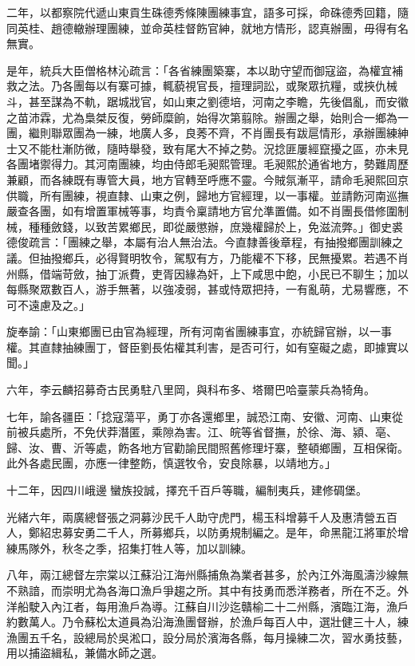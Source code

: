 \begin{pinyinscope}
二年，以都察院代遞山東貢生硃德秀條陳團練事宜，語多可採，命硃德秀回籍，隨同英桂、趙德轍辦理團練，並命英桂督飭官紳，就地方情形，認真辦團，毋得有名無實。

是年，統兵大臣僧格林沁疏言：「各省練團築寨，本以助守望而御寇盜，為權宜補救之法。乃各團每以有寨可據，輒藐視官長，擅理詞訟，或聚眾抗糧，或挾仇械斗，甚至謀為不軌，踞城戕官，如山東之劉德培，河南之李瞻，先後倡亂，而安徽之苗沛霖，尤為梟桀反復，勞師糜餉，始得次第翦除。辦團之舉，始則合一鄉為一團，繼則聯眾團為一練，地廣人多，良莠不齊，不肖團長有跋扈情形，承辦團練紳士又不能杜漸防微，隨時舉發，致有尾大不掉之勢。況捻匪屢經竄擾之區，亦未見各團堵禦得力。其河南團練，均由侍郎毛昶熙管理。毛昶熙於通省地方，勢難周歷兼顧，而各練既有專管大員，地方官轉至呼應不靈。今賊氛漸平，請命毛昶熙回京供職，所有團練，視直隸、山東之例，歸地方官經理，以一事權。並請飭河南巡撫嚴查各團，如有增置軍械等事，均責令稟請地方官允準置備。如不肖團長借修圍制械，種種斂錢，以致苦累鄉民，即從嚴懲辦，庶幾權歸於上，免滋流弊。」御史裘德俊疏言：「團練之舉，本屬有治人無治法。今直隸善後章程，有抽撥鄉團訓練之議。但抽撥鄉兵，必得賢明牧令，駕馭有方，乃能權不下移，民無擾累。若遇不肖州縣，借端苛斂，抽丁派費，吏胥因緣為奸，上下咸思中飽，小民已不聊生；加以每縣聚眾數百人，游手無著，以強凌弱，甚或恃眾把持，一有亂萌，尤易響應，不可不遠慮及之。」

旋奉諭：「山東鄉團已由官為經理，所有河南省團練事宜，亦統歸官辦，以一事權。其直隸抽練團丁，督臣劉長佑權其利害，是否可行，如有窒礙之處，即據實以聞。」

六年，李云麟招募奇古民勇駐八里岡，與科布多、塔爾巴哈臺蒙兵為犄角。

七年，諭各疆臣：「捻寇蕩平，勇丁亦各還鄉里，誠恐江南、安徽、河南、山東從前被兵處所，不免伏莽潛匿，乘隙為害。江、皖等省督撫，於徐、海、潁、亳、歸、汝、曹、沂等處，飭各地方官勸諭民間照舊修理圩寨，整頓鄉團，互相保衛。此外各處民團，亦應一律整飭，慎選牧令，安良除暴，以靖地方。」

十二年，因四川峨邊蠻族投誠，擇充千百戶等職，編制夷兵，建修碉堡。

光緒六年，兩廣總督張之洞募沙民千人助守虎門，楊玉科增募千人及惠清營五百人，鄭紹忠募安勇二千人，所募鄉兵，以防勇規制編之。是年，命黑龍江將軍於增練馬隊外，秋冬之季，招集打牲人等，加以訓練。

八年，兩江總督左宗棠以江蘇沿江海州縣捕魚為業者甚多，於內江外海風濤沙線無不熟諳，而崇明尤為各海口漁戶爭趨之所。其中有技勇而悉洋務者，所在不乏。外洋船駛入內江者，每用漁戶為導。江蘇自川沙迄贛榆二十二州縣，濱臨江海，漁戶約數萬人。乃令蘇松太道員為沿海漁團督辦，於漁戶每百人中，選壯健三十人，練漁團五千名，設總局於吳淞口，設分局於濱海各縣，每月操練二次，習水勇技藝，用以捕盜緝私，兼備水師之選。


\end{pinyinscope}

